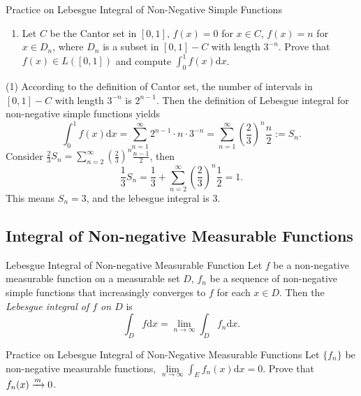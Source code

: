 \begin{example}{Practice on Lebesgue Integral of Non-Negative Simple Functions}{}
  \begin{enumerate}
  \item Let $C$ be the Cantor set in $[0, 1]$,
    $f(x) = 0$ for $x \in C$, $f(x) = n$ for $x \in D_n$,
    where $D_n$ is a subset in $[0, 1] - C$ with length $3^{-n}$.
    Prove that $f(x) \in L([0, 1])$ and compute $\int_0^1 f(x)\mathrm{d} x$.
  \end{enumerate}
\end{example}

\begin{solution}
  (1) According to the definition of Cantor set,
  the number of intervals in $[0, 1] - C$ with length $3^{-n}$ is $2^{n-1}$.
  Then the definition of Lebesgue integral for non-negative simple functions yields
  \begin{equation}
    \int_0^1 f(x)\mathrm{d} x
    = \sum\limits_{n = 1}^{\infty} 2^{n-1} \cdot n \cdot 3^{-n}
    = \sum\limits_{n = 1}^{\infty} \left( \frac{2}{3} \right)^n \frac{n}{2}
    := S_n.
  \end{equation}
  Consider $\frac{2}{3}S_n = \sum\limits_{n = 2}^{\infty} (\frac{2}{3})^n
  \frac{n-1}{2}$, then
  \begin{equation}
    \frac{1}{3}S_n = \frac{1}{3} + \sum\limits_{n = 2}^{\infty} \left( \frac{2}{3} \right)^n \frac{1}{2}
    = 1.
  \end{equation}
  This means $S_n = 3$, and the lebesgue integral is $3$.
\end{solution}

\subsection{Integral of Non-negative Measurable Functions}

\begin{definition}{Lebesgue Integral of Non-negative Measurable Function}{}
  Let $f$ be a non-negative measurable function on a measurable set $D$,
  $f_n$ be a sequence of non-negative simple functions that increasingly
  converges to $f$ for each $x \in D$.
  Then the \emph{Lebesgue integral of $f$ on $D$} is
  \begin{equation}
    \int_D f \mathrm{d} x= \lim \limits _{n \rightarrow \infty} \int_D f_n \mathrm{d} x.
  \end{equation}
\end{definition}

\begin{example}{Practice on Lebesgue Integral of Non-Negative Measurable Functions}{}
  Let $\{f_n\}$ be non-negative measurable functions,
  $\lim \limits _{n \rightarrow \infty} \int_E f_n(x)\mathrm{d} x = 0$.
  Prove that $f_n(x) \xrightarrow{m} 0$.
\end{example}


